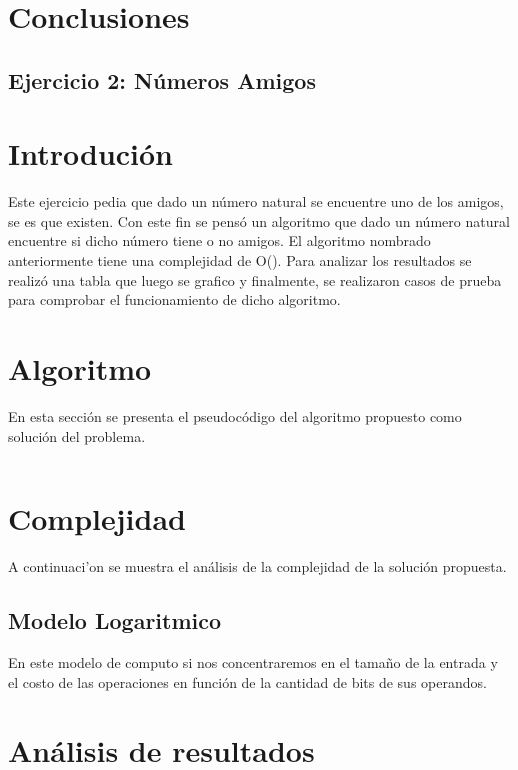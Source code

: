 \documentclass[a4paper, 12pt] {article}
\begin{document}
\section*{Conclusiones}

\newpage

\begin{center}
\section*{Ejercicio 2: N\'umeros Amigos}
\end{center}

\bigskip
\section*{Introduci\'on}
Este ejercicio pedia que dado un n\'umero natural se encuentre uno de los amigos, se es que existen.
Con este fin se pens\'o un algoritmo que dado un n\'umero natural encuentre si dicho n\'umero tiene o no amigos.
El algoritmo nombrado anteriormente tiene una complejidad de O(). Para analizar los resultados se realiz\'o una tabla que luego se grafico y finalmente, se realizaron casos de prueba para comprobar el funcionamiento de dicho algoritmo. 
\section*{Algoritmo}
En esta secci\'on se presenta el pseudoc\'odigo del algoritmo propuesto como soluci\'on del problema.
\begin{verbatim}
\end{verbatim}

\section*{Complejidad}
A continuaci'on se muestra el an\'alisis de la complejidad de la soluci\'on propuesta.
\subsection*{Modelo Logaritmico}
En este modelo de computo si nos concentraremos en el tama\~{n}o de la entrada y el costo de las operaciones en funci\'on de la cantidad de bits de sus operandos.

\section*{An\'alisis de resultados}
\end{document}
